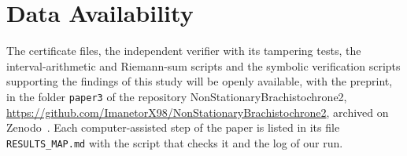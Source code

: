 \documentclass[aip,jmp,amsmath,amssymb,reprint]{revtex4-2}
\theoremstyle{plain}
\theoremstyle{definition}
\begin{document}
\section*{Data Availability}
The certificate files, the independent verifier with its tampering tests, the interval-arithmetic and Riemann-sum
scripts and the symbolic verification scripts supporting the findings of this study will be openly available,
with the preprint, in the folder \texttt{paper3} of the repository NonStationaryBrachistochrone2,
\url{https://github.com/ImanetorX98/NonStationaryBrachistochrone2}, archived on Zenodo~\cite{Rosignoli2026CodeIII}. Each computer-assisted step of the paper is listed in its file
\texttt{RESULTS\_MAP.md} with the script that checks it and the log of our run.


\end{document}
